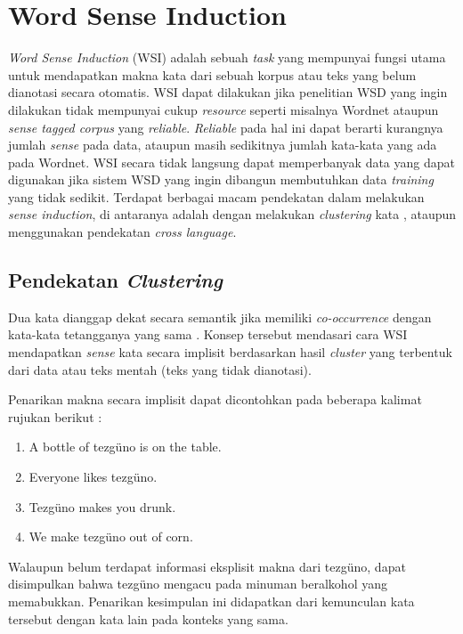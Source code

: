 \section{Word Sense Induction}
\textit{Word Sense Induction} (WSI) adalah sebuah \textit{task} yang mempunyai fungsi utama untuk mendapatkan makna kata dari sebuah korpus atau teks yang belum dianotasi secara otomatis. WSI dapat dilakukan jika penelitian WSD yang ingin dilakukan tidak mempunyai cukup \textit{resource} seperti misalnya Wordnet ataupun \textit{sense tagged corpus} yang \textit{reliable}. \textit{Reliable} pada hal ini dapat berarti kurangnya jumlah \textit{sense} pada data, ataupun masih sedikitnya jumlah kata-kata yang ada pada Wordnet. WSI secara tidak langsung dapat memperbanyak data yang dapat digunakan jika sistem WSD yang ingin dibangun membutuhkan data \textit{training} yang tidak sedikit. Terdapat berbagai macam pendekatan dalam melakukan \textit{sense induction}, di antaranya adalah dengan melakukan \textit{clustering} kata \citep{denkowski2009survey}, ataupun menggunakan pendekatan \textit{cross language}.
	
	\subsection{Pendekatan \textit{Clustering}}
	Dua kata dianggap dekat secara semantik jika memiliki \textit{co-occurrence} dengan kata-kata tetangganya yang sama \citep{nasiruddin2013state}. Konsep tersebut mendasari cara WSI mendapatkan \textit{sense} kata secara implisit berdasarkan hasil \textit{cluster} yang terbentuk dari data atau teks mentah (teks yang tidak dianotasi).
	
	Penarikan makna secara implisit dapat dicontohkan pada beberapa kalimat rujukan berikut \citep{denkowski2009survey}:
	
	\begin{enumerate}
		\item A bottle of tezg\"{u}no is on the table.
		\item Everyone likes tezg\"{u}no.
		\item Tezg\"{u}no makes you drunk.
		\item We make tezg\"{u}no out of corn.
	\end{enumerate}
	
	Walaupun belum terdapat informasi eksplisit makna dari tezg\"{u}no, dapat disimpulkan bahwa tezg\"{u}no mengacu pada minuman beralkohol yang memabukkan. Penarikan kesimpulan ini didapatkan dari kemunculan kata tersebut dengan kata lain pada konteks yang sama.
	
